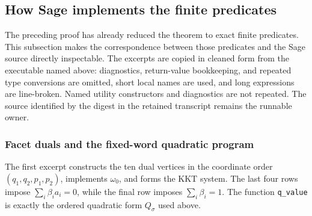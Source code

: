 \clearpage
\subsection{How Sage implements the finite predicates}
\label{subsec:rotated-pentagon-sage-source}

The preceding proof has already reduced the theorem to exact finite
predicates.  This subsection makes the correspondence between those
predicates and the Sage source directly inspectable.  The excerpts are copied
in cleaned form from the executable named above: diagnostics, return-value
bookkeeping, and repeated type conversions are omitted, short local names are
used, and long expressions are line-broken.  Named utility constructors and
diagnostics are not repeated.  The source identified by the digest in the
retained transcript remains the runnable owner.

\subsubsection*{Facet duals and the fixed-word quadratic program}
The first excerpt constructs the ten dual vertices in the coordinate order
\((q_1,q_2,p_1,p_2)\), implements \(\omega_0\), and forms the KKT system.
The last four rows impose
\(\sum_i\beta_i a_i=0\), while the final row imposes
\(\sum_i\beta_i=1\).  The function \texttt{q\_value} is exactly the ordered
quadratic form \(Q_\sigma\) used above.

